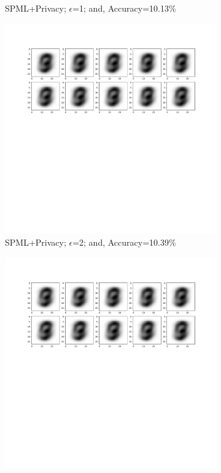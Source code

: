 \begin{figure}
\begin{subfigure}{.325\textwidth}
         \vspace{-8em}
         \caption{SPML+Privacy; $\epsilon$=1; and, Accuracy=10.13\%}
         \label{default}
     \end{subfigure}
     \begin{subfigure}{.325\textwidth}
         \includegraphics[width=\textwidth]{images/Hw_attack/Mnistattack2.pdf}
         \vspace{-8em}
         \caption{SPML+Privacy; $\epsilon$=2; and, Accuracy=10.39\%}
         \label{default}
     \end{subfigure}
     \begin{subfigure}{.325\textwidth}
         \includegraphics[width=\textwidth]{images/Hw_attack/Mnistattack4.pdf}

\end{subfigure}
\end{figure}
